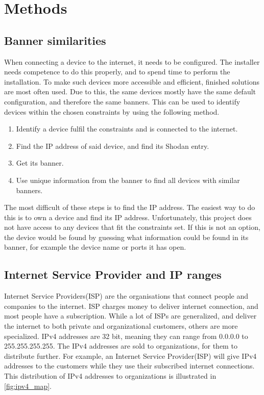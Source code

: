\section{Methods}

\subsection{Banner similarities}
When connecting a device to the internet, it needs to be configured. The installer needs competence to do this properly, and to spend time to perform the installation. To make such devices more accessible and efficient, finished solutions are most often used. Due to this, the same devices mostly have the same default configuration, and therefore the same banners. This can be used to identify devices within the chosen constraints by using the following method.
\begin{enumerate}
    \item Identify a device fulfil the constraints and is connected to the internet.
    \item Find the IP address of said device, and find its Shodan entry.
    \item Get its banner.
    \item Use unique information from the banner to find all devices with similar banners.
\end{enumerate}
The most difficult of these steps is to find the IP address. The easiest way to do this is to own a device and find its IP address. Unfortunately, this project does not have access to any devices that fit the constraints set.
If this is not an option, the device would be found by guessing what information could be found in its banner, for example the device name or ports it has open.


\subsection{Internet Service Provider and IP ranges} \label{sec:isp_method}
Internet Service Providers(ISP) are the organisations that connect people and companies to the internet. ISP charges money to deliver internet connection, and most people have a subscription. While a lot of ISPs are generalized, and deliver the internet to both private and organizational customers, others are more specialized. 
IPv4 addresses are 32 bit, meaning they can range from 0.0.0.0 to 255.255.255.255. The IPv4 addresses are sold to organizations, for them to distribute further. For example, an Internet Service Provider(ISP) will give IPv4 addresses to the customers while they use their subscribed internet connections. This distribution of IPv4 addresses to organizations is illustrated in \cref{fig:ipv4_map}.

